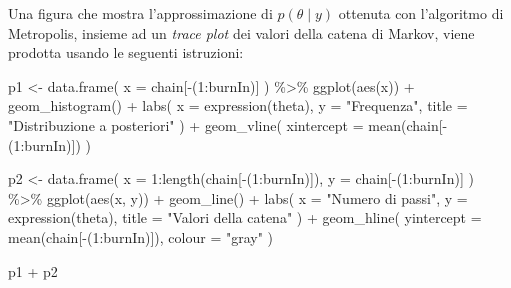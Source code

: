 \documentclass[
]{memoir}
\newenvironment{Shaded}{\begin{snugshade}}{\end{snugshade}}
\newcommand{\AttributeTok}[1]{\textcolor[rgb]{0.77,0.63,0.00}{#1}}
\newcommand{\DecValTok}[1]{\textcolor[rgb]{0.00,0.00,0.81}{#1}}
\newcommand{\FunctionTok}[1]{\textcolor[rgb]{0.00,0.00,0.00}{#1}}
\newcommand{\NormalTok}[1]{#1}
\newcommand{\OtherTok}[1]{\textcolor[rgb]{0.56,0.35,0.01}{#1}}
\newcommand{\SpecialCharTok}[1]{\textcolor[rgb]{0.00,0.00,0.00}{#1}}
\newcommand{\StringTok}[1]{\textcolor[rgb]{0.31,0.60,0.02}{#1}}
\begin{document}
Una figura che mostra l'approssimazione di \(p(\theta \mid y)\) ottenuta con l'algoritmo di Metropolis, insieme ad un \emph{trace plot} dei valori della catena di Markov, viene prodotta usando le seguenti istruzioni:

\begin{Shaded}
\begin{Highlighting}[]
\NormalTok{p1 }\OtherTok{\textless{}{-}} \FunctionTok{data.frame}\NormalTok{(}
  \AttributeTok{x =}\NormalTok{ chain[}\SpecialCharTok{{-}}\NormalTok{(}\DecValTok{1}\SpecialCharTok{:}\NormalTok{burnIn)]}
\NormalTok{  ) }\SpecialCharTok{\%\textgreater{}\%}
  \FunctionTok{ggplot}\NormalTok{(}\FunctionTok{aes}\NormalTok{(x)) }\SpecialCharTok{+}
  \FunctionTok{geom\_histogram}\NormalTok{() }\SpecialCharTok{+}
  \FunctionTok{labs}\NormalTok{(}
    \AttributeTok{x =} \FunctionTok{expression}\NormalTok{(theta),}
    \AttributeTok{y =} \StringTok{"Frequenza"}\NormalTok{,}
    \AttributeTok{title =} \StringTok{"Distribuzione a posteriori"}
\NormalTok{  ) }\SpecialCharTok{+}
  \FunctionTok{geom\_vline}\NormalTok{(}
    \AttributeTok{xintercept =} \FunctionTok{mean}\NormalTok{(chain[}\SpecialCharTok{{-}}\NormalTok{(}\DecValTok{1}\SpecialCharTok{:}\NormalTok{burnIn)])}
\NormalTok{  )}

\NormalTok{p2 }\OtherTok{\textless{}{-}} \FunctionTok{data.frame}\NormalTok{(}
  \AttributeTok{x =} \DecValTok{1}\SpecialCharTok{:}\FunctionTok{length}\NormalTok{(chain[}\SpecialCharTok{{-}}\NormalTok{(}\DecValTok{1}\SpecialCharTok{:}\NormalTok{burnIn)]),}
  \AttributeTok{y =}\NormalTok{ chain[}\SpecialCharTok{{-}}\NormalTok{(}\DecValTok{1}\SpecialCharTok{:}\NormalTok{burnIn)]}
\NormalTok{  ) }\SpecialCharTok{\%\textgreater{}\%}
  \FunctionTok{ggplot}\NormalTok{(}\FunctionTok{aes}\NormalTok{(x, y)) }\SpecialCharTok{+}
  \FunctionTok{geom\_line}\NormalTok{() }\SpecialCharTok{+}
  \FunctionTok{labs}\NormalTok{(}
    \AttributeTok{x =} \StringTok{"Numero di passi"}\NormalTok{,}
    \AttributeTok{y =} \FunctionTok{expression}\NormalTok{(theta),}
    \AttributeTok{title =} \StringTok{"Valori della catena"}
\NormalTok{  ) }\SpecialCharTok{+}
  \FunctionTok{geom\_hline}\NormalTok{(}
    \AttributeTok{yintercept =} \FunctionTok{mean}\NormalTok{(chain[}\SpecialCharTok{{-}}\NormalTok{(}\DecValTok{1}\SpecialCharTok{:}\NormalTok{burnIn)]),}
    \AttributeTok{colour =} \StringTok{"gray"}
\NormalTok{  )}

\NormalTok{p1 }\SpecialCharTok{+}\NormalTok{ p2}
\end{Highlighting}
\end{Shaded}
\end{document}
